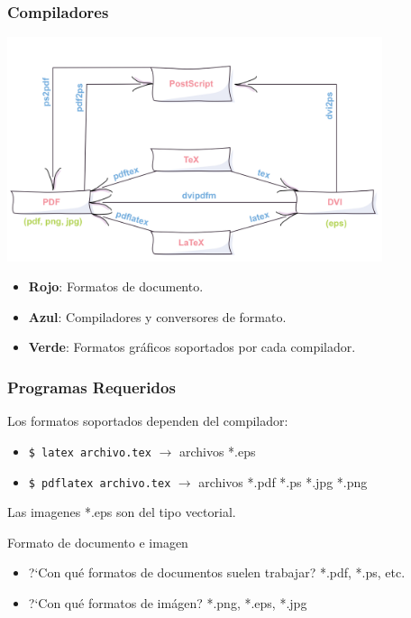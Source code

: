 \documentclass[aspectratio=43]{beamer}%
\begin{document}
\begin{frame}[fragile]
\frametitle{\textbf{Compiladores}}
\justifying
 \vspace{-0.5cm}
 \begin{center}
\includegraphics[width=11cm]{images/compiador}
\end{center}
\vspace{-0.5cm}
 \begin{itemize}\justifying
  \item \textbf{Rojo}: Formatos de documento.
  \item \textbf{Azul}: Compiladores y conversores de formato.
  \item \textbf{Verde}: Formatos gráficos soportados por cada compilador.
\end{itemize}

\end{frame}

\begin{frame}[fragile]
\frametitle{\textbf{Programas Requeridos}}
\justifying
 Los formatos soportados dependen del compilador:
 \begin{itemize}\justifying
  \item \verb+$ latex archivo.tex+ $\rightarrow$ archivos *.eps
  \item \verb+$ pdflatex archivo.tex+ $\rightarrow$ archivos *.pdf *.ps *.jpg *.png
\end{itemize}
Las imagenes *.eps son del tipo vectorial.
\begin{block}{Formato de documento e imagen}
\begin{itemize}\justifying
  \item ?`Con qué formatos de documentos suelen trabajar? *.pdf, *.ps, etc.
  \item ?`Con qué formatos de imágen? *.png, *.eps, *.jpg
\end{itemize}

\end{block}

\end{frame}
\end{document}
